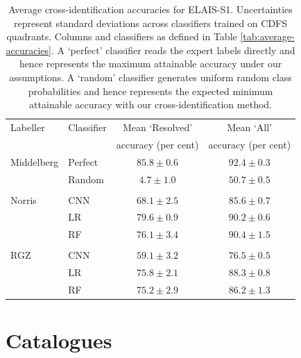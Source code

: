 \documentclass[fleqn,usenatbib,usedcolumn]{mnras}
\begin{document}
\begin{table}
  \caption{Average cross-identification accuracies for ELAIS-S1.
    Uncertainties represent standard deviations across classifiers trained
    on CDFS quadrants. Columns and classifiers as defined in Table
    \ref{tab:average-accuracies}.  A `perfect' classifier reads the expert
    labels directly and hence represents the maximum attainable accuracy
    under our assumptions. A `random' classifier generates uniform random
    class probabilities and hence represents the expected minimum attainable
    accuracy with our cross-identification method.}
    \label{tab:cross-id-accuracies-elais}
  \begin{tabular}{llcc}
    \hline
    Labeller & Classifier  & Mean `Resolved' & Mean `All' \\
     & & accuracy (per cent) & accuracy (per cent)\\
    \hline
    Middelberg & Perfect & $85.8 \pm 0.6$ & $92.4 \pm 0.3$\\
               & Random  & $4.7 \pm 1.0$  & $50.7 \pm 0.5$\\
     \\
    Norris & CNN     & $68.1 \pm 2.5$ & $85.6 \pm 0.7$\\
           & LR      & $79.6 \pm 0.9$ & $90.2 \pm 0.6$\\
           & RF      & $76.1 \pm 3.4$ & $90.4 \pm 1.5$\\
     \\
    RGZ & CNN & $59.1 \pm 3.2$ & $76.5 \pm 0.5$\\
        & LR  & $75.8 \pm 2.1$ & $88.3 \pm 0.8$\\
        & RF  & $75.2 \pm 2.9$ & $86.2 \pm 1.3$\\
     \hline
  \end{tabular}
\end{table}


\section{Catalogues}
\end{document}
